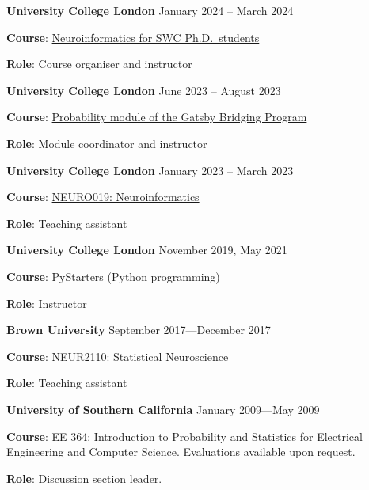 \documentclass{article}
\begin{document}
\par
\vspace{.1in}
{\bf University College London} \hspace*{\fill} January 2024 -- March 2024
\par
{\bf Course}:
\href{https://github.com/joacorapela/neuroinformatics24}{Neuroinformatics for SWC Ph.D.\ students}
\par
{\bf Role}: Course organiser and instructor

\par
\vspace{.1in}
{\bf University College London} \hspace*{\fill} June 2023 -- August 2023
\par
{\bf Course}:
\href{https://github.com/joacorapela/gcnuBridging2023/}{Probability module of the Gatsby Bridging Program}
\par
{\bf Role}: Module coordinator and instructor

\par
\vspace{.1in}
{\bf University College London} \hspace*{\fill} January 2023 -- March 2023
\par
{\bf Course}: \href{https://github.com/joacorapela/neuroinformatics23}{NEURO019: Neuroinformatics}
\par
{\bf Role}: Teaching assistant

\par
\vspace{.1in}
{\bf University College London} \hspace*{\fill} November 2019, May 2021
\par
{\bf Course}: PyStarters (Python programming)
\par
{\bf Role}: Instructor

\par
\vspace{.1in}
{\bf Brown University} \hspace*{\fill} September 2017---December 2017
\par
{\bf Course}: NEUR2110: Statistical Neuroscience
\par
{\bf Role}: Teaching assistant

\par
\vspace{.1in}
{\bf University of Southern California} \hspace*{\fill} January 2009---May 2009
\par
{\bf Course}: EE 364: Introduction to Probability and Statistics for Electrical Engineering and Computer Science. Evaluations available upon request.
\par
{\bf Role}: Discussion section leader.
\end{document}
